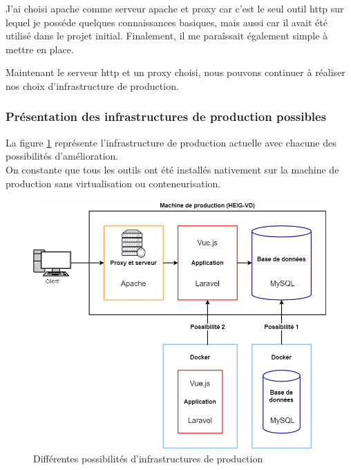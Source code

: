\documentclass[
    iai, %
    il, %
]{heig-tb}
\begin{document}
J'ai choisi \Gls{apache} comme serveur \Gls{apache} et \Gls{proxy} car c'est le seul outil \Gls{http} sur lequel je posséde quelques connaissances basiques, mais aussi car il avait été utilisé dans le projet initial. Finalement, il me paraîssait également simple à mettre en place.

Maintenant le serveur \Gls{http} et un \Gls{proxy} choisi, nous pouvons continuer à réaliser nos choix d'infrastructure de production.

\subsubsection{Présentation des infrastructures de production possibles}

La figure \ref{infrastructure-prod-choix.drawio} représente l'infrastructure de production actuelle avec chacune des possibilités d'amélioration. \\
On constante que tous les outils ont été installés nativement sur la machine de production sans virtualisation ou conteneurisation.

\begin{center}
    \begin{figure}[H]
        \includegraphics[width=\textwidth]{./assets/figures/infrastructure-prod-choix.drawio.png}
        \caption{Différentes possibilités d'infrastructures de production \label{infrastructure-prod-choix.drawio}}
    \end{figure}
\end{center}
\end{document}
